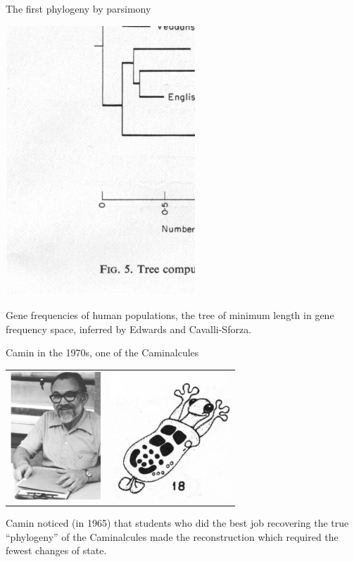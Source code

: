 \documentclass[pdf,bluish,slideColor,colorBG]{prosper}
\begin{document}
\begin{slide}[Replace]{The first phylogeny by parsimony}

\begin{center}
\includegraphics[width=2.8in]{edwardstree3.ps}
\end{center}

Gene frequencies of human populations, the tree of minimum length in gene
frequency space, inferred by Edwards and Cavalli-Sforza.

\end{slide}

\begin{slide}[Replace]{Camin in the 1970s, one of the Caminalcules}

\begin{center}
\begin{tabular}{c c}
\includegraphics[height=1.9in]{camin3.ps} &
\includegraphics[height=1.9in]{caminalcule.ps}
\end{tabular}
\end{center}
\medskip

Camin noticed (in 1965) that students who did the best job recovering the true
``phylogeny'' of the Caminalcules made the reconstruction which required the
fewest changes of state.

\end{slide}
\end{document}
